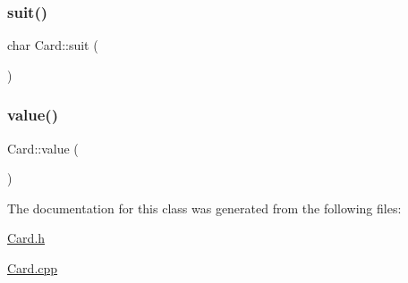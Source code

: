 \subsubsection{\texorpdfstring{suit()}{suit()}}
{\footnotesize\ttfamily char Card\+::suit (\begin{DoxyParamCaption}{ }\end{DoxyParamCaption})}

\hypertarget{class_card_ab8abc1fb7afe26a4f5be4ae5ce08e936}{}\label{class_card_ab8abc1fb7afe26a4f5be4ae5ce08e936} 
\subsubsection{\texorpdfstring{value()}{value()}}
{\footnotesize\ttfamily Card\+::value (\begin{DoxyParamCaption}{ }\end{DoxyParamCaption})}



The documentation for this class was generated from the following files\+:\begin{DoxyCompactItemize}
\item 
\hyperlink{_card_8h}{Card.\+h}\item 
\hyperlink{_card_8cpp}{Card.\+cpp}\end{DoxyCompactItemize}
